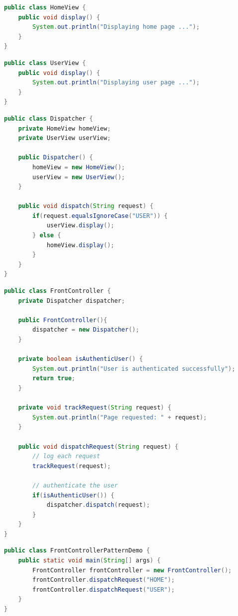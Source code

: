 \vspace{0.5cm}

\begin{lstlisting}[language=Java, title=HomeView.java]
public class HomeView {
    public void display() {
        System.out.println("Displaying home page ...");
    }
}
\end{lstlisting}

\begin{lstlisting}[language=Java, title=UserView.java]
public class UserView {
    public void display() {
        System.out.println("Displaying user page ...");
    }
}
\end{lstlisting}

\begin{lstlisting}[language=Java, title=Dispatcher.java]
public class Dispatcher {
    private HomeView homeView;
    private UserView userView;

    public Dispatcher() {
        homeView = new HomeView();
        userView = new UserView();
    }

    public void dispatch(String request) {
        if(request.equalsIgnoreCase("USER")) {
            userView.display();
        } else {
            homeView.display();
        }
    }
}
\end{lstlisting}

\begin{lstlisting}[language=Java, title=FrontController.java]
public class FrontController {
    private Dispatcher dispatcher;

    public FrontController(){
        dispatcher = new Dispatcher();
    }

    private boolean isAuthenticUser() {
        System.out.println("User is authenticated successfully");
        return true;
    }

    private void trackRequest(String request) {
        System.out.println("Page requested: " + request);
    }

    public void dispatchRequest(String request) {
        // log each request
        trackRequest(request);

        // authenticate the user
        if(isAuthenticUser()) {
            dispatcher.dispatch(request);
        }
    }
}    
\end{lstlisting}

\begin{lstlisting}[language=Java, title=FrontControllerPatternDemo.java]
public class FrontControllerPatternDemo {
    public static void main(String[] args) {
        FrontController frontController = new FrontController();
        frontController.dispatchRequest("HOME");
        frontController.dispatchRequest("USER");
    }
}
\end{lstlisting}

